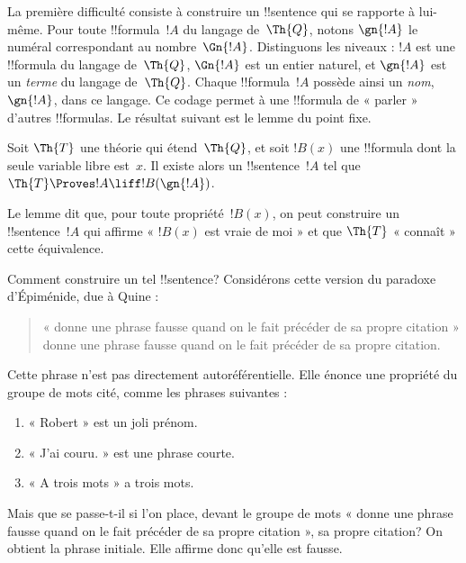 \documentclass[../../../include/open-logic-section]{subfiles}
\begin{document}
La première difficulté consiste à construire un
!!{sentence} qui se rapporte à lui-même. Pour
toute !!{formula}~$!A$ du langage de~$\Th{Q}$,
notons $\gn{!A}$ le numéral correspondant au
nombre~$\Gn{!A}$. Distinguons les niveaux : $!A$
est une !!{formula} du langage de~$\Th{Q}$,
$\Gn{!A}$ est un entier naturel, et $\gn{!A}$
est un \emph{terme} du langage de~$\Th{Q}$.
Chaque !!{formula}~$!A$ possède ainsi un
\emph{nom}, $\gn{!A}$, dans ce langage. Ce codage
permet à une !!{formula} de « parler » d'autres
!!{formula}s. Le résultat suivant est le lemme
du point fixe.

\begin{lem}
Soit $\Th{T}$ une théorie qui étend~$\Th{Q}$,
et soit $!B(x)$ une !!{formula} dont la seule
variable libre est~$x$. Il existe alors un
!!{sentence}~$!A$ tel que
$\Th{T}\Proves !A\liff !B(\gn{!A})$.
\end{lem}

Le lemme dit que, pour toute propriété~$!B(x)$,
on peut construire un !!{sentence}~$!A$ qui
affirme « $!B(x)$ est vraie de moi » et que
$\Th{T}$ « connaît » cette équivalence.

Comment construire un tel !!{sentence}?
Considérons cette version du paradoxe d'Épiménide,
due à Quine :
\begin{quote}
« donne une phrase fausse quand on le fait précéder
de sa propre citation » donne une phrase fausse quand
on le fait précéder de sa propre citation.
\end{quote}
Cette phrase n'est pas directement autoréférentielle.
Elle énonce une propriété du groupe de mots cité,
comme les phrases suivantes :
\begin{enumerate}
\item « Robert » est un joli prénom.
\item « J'ai couru. » est une phrase courte.
\item « A trois mots » a trois mots.
\end{enumerate}
Mais que se passe-t-il si l'on place, devant le
groupe de mots « donne une phrase fausse quand on
le fait précéder de sa propre citation », sa
propre citation? On obtient la phrase initiale.
Elle affirme donc qu'elle est fausse.
\end{document}
